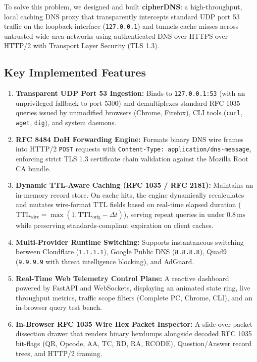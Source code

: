 \documentclass[10pt,a4paper]{article}
\begin{document}
To solve this problem, we designed and built \textbf{cipherDNS}: a high-throughput, local caching DNS proxy that transparently intercepts standard UDP port 53 traffic on the loopback interface (\texttt{127.0.0.1}) and tunnels cache misses across untrusted wide-area networks using authenticated DNS-over-HTTPS over HTTP/2 with Transport Layer Security (TLS 1.3). 

\subsection*{Key Implemented Features}
\begin{enumerate}\itemsep 2pt
    \item \textbf{Transparent UDP Port 53 Ingestion:} Binds to \texttt{127.0.0.1:53} (with an unprivileged fallback to port 5300) and demultiplexes standard RFC 1035 queries issued by unmodified browsers (Chrome, Firefox), CLI tools (\texttt{curl}, \texttt{wget}, \texttt{dig}), and system daemons.
    \item \textbf{RFC 8484 DoH Forwarding Engine:} Formats binary DNS wire frames into HTTP/2 \texttt{POST} requests with \texttt{Content-Type: application/dns-message}, enforcing strict TLS 1.3 certificate chain validation against the Mozilla Root CA bundle.
    \item \textbf{Dynamic TTL-Aware Caching (RFC 1035 / RFC 2181):} Maintains an in-memory record store. On cache hits, the engine dynamically recalculates and mutates wire-format TTL fields based on real-time elapsed duration ($\text{TTL}_{\text{wire}} = \max(1, \text{TTL}_{\text{orig}} - \Delta t)$), serving repeat queries in under $0.8\,\text{ms}$ while preserving standards-compliant expiration on client caches.
    \item \textbf{Multi-Provider Runtime Switching:} Supports instantaneous switching between Cloudflare (\texttt{1.1.1.1}), Google Public DNS (\texttt{8.8.8.8}), Quad9 (\texttt{9.9.9.9} with threat intelligence blocking), and AdGuard.
    \item \textbf{Real-Time Web Telemetry Control Plane:} A reactive dashboard powered by FastAPI and WebSockets, displaying an animated state ring, live throughput metrics, traffic scope filters (Complete PC, Chrome, CLI), and an in-browser query test bench.
    \item \textbf{In-Browser RFC 1035 Wire Hex Packet Inspector:} A slide-over packet dissection drawer that renders binary hexdumps alongside decoded RFC 1035 bit-flags (QR, Opcode, AA, TC, RD, RA, RCODE), Question/Answer record trees, and HTTP/2 framing.

\end{enumerate}
\end{document}
